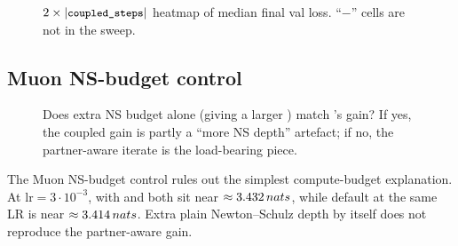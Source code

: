 \begin{figure}[h]
\centering
{}
\caption{$2\times \lvert\texttt{\small coupled\_steps}\rvert$ heatmap of median final val loss. ``$-$'' cells are not in the sweep.}\label{fig:d4-steps-x-polish}
\end{figure}

\subsection{Muon NS-budget control}

\begin{figure}[h]
\centering
{}
\caption{Does extra NS budget alone (giving \optMuon{} a larger ) match \optCoupled{}'s gain? If yes, the coupled gain is partly a ``more NS depth'' artefact; if no, the partner-aware iterate is the load-bearing piece.}\label{fig:d4-ns-budget}
\end{figure}

The Muon NS-budget control rules out the simplest compute-budget explanation. At $\mathrm{lr}=3\!\cdot\!10^{-3}$, \optMuon{} with  and  both sit near $\approx 3.432\,nats{}$, while default \optCoupled{} at the same LR is near $\approx 3.414\,nats{}$. Extra plain Newton--Schulz depth by itself does not reproduce the partner-aware gain.
